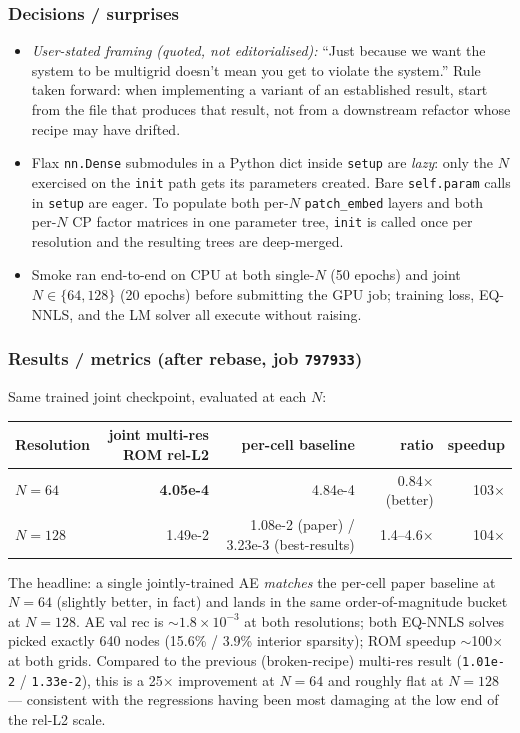 \subsubsection*{Decisions / surprises}
\begin{itemize}
  \item \textit{User-stated framing (quoted, not editorialised):} ``Just because
        we want the system to be multigrid doesn't mean you get to violate the
        system.'' Rule taken forward: when implementing a variant of an
        established result, start from the file that produces that result, not
        from a downstream refactor whose recipe may have drifted.
  \item Flax \texttt{nn.Dense} submodules in a Python dict inside
        \texttt{setup} are \emph{lazy}: only the $N$ exercised on the
        \texttt{init} path gets its parameters created. Bare \texttt{self.param}
        calls in \texttt{setup} are eager. To populate both per-$N$
        \texttt{patch\_embed} layers and both per-$N$ CP factor matrices in
        one parameter tree, \texttt{init} is called once per resolution and
        the resulting trees are deep-merged.
  \item Smoke ran end-to-end on CPU at both single-$N$ (50 epochs) and joint
        $N\in\{64,128\}$ (20 epochs) before submitting the GPU job; training
        loss, EQ-NNLS, and the LM solver all execute without raising.
\end{itemize}

\subsubsection*{Results / metrics (after rebase, job \texttt{797933})}

Same trained joint checkpoint, evaluated at each $N$:
\begin{center}
\begin{tabular}{l r r r r}
  \textbf{Resolution} & \textbf{joint multi-res ROM rel-L2} & \textbf{per-cell baseline} & \textbf{ratio} & \textbf{speedup} \\
  \hline
  $N{=}64$  & \textbf{4.05e-4} & 4.84e-4 & 0.84$\times$ (better) & 103$\times$ \\
  $N{=}128$ & 1.49e-2 & 1.08e-2 (paper) / 3.23e-3 (best-results) & 1.4--4.6$\times$ & 104$\times$ \\
\end{tabular}
\end{center}

The headline: a single jointly-trained AE \emph{matches} the per-cell paper
baseline at $N{=}64$ (slightly better, in fact) and lands in the same
order-of-magnitude bucket at $N{=}128$. AE val rec is $\sim 1.8\times 10^{-3}$
at both resolutions; both EQ-NNLS solves picked exactly 640 nodes
(15.6\% / 3.9\% interior sparsity); ROM speedup $\sim$100$\times$ at both
grids. Compared to the previous (broken-recipe) multi-res result
(\texttt{1.01e-2} / \texttt{1.33e-2}), this is a 25$\times$ improvement at
$N{=}64$ and roughly flat at $N{=}128$ --- consistent with the regressions
having been most damaging at the low end of the rel-L2 scale.

